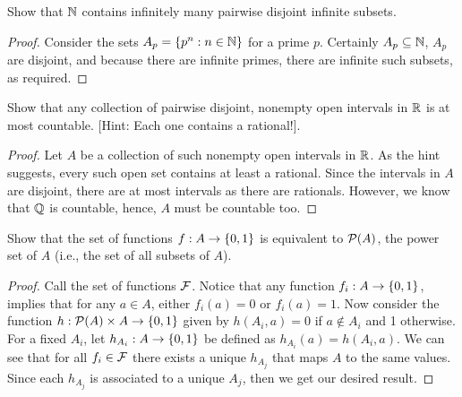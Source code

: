 \begin{exercise}{13}
Show that $\mathbb{N}$ contains infinitely many pairwise disjoint infinite subsets.
\end{exercise}
\begin{proof}
Consider the sets $A_p=\{p^n: n\in\mathbb{N}\}$ for a prime $p$. Certainly $A_p\subseteq \mathbb{N}$, $A_p$ are disjoint, and because there are infinite primes, there are infinite such subsets, as required.
\end{proof} 

\begin{exercise}{15}
Show that any collection of pairwise disjoint, nonempty open intervals in $\mathbb{R}$ is at most countable. [Hint: Each one contains a rational!].
\end{exercise}
\begin{proof}
Let $A$ be a collection of such nonempty open intervals in $\mathbb{R}$. As the hint suggests, every such open set contains at least a rational. Since the intervals in $A$ are disjoint, there are at most intervals as there are rationals. However, we know that $\mathbb{Q}$ is countable, hence, $A$ must be countable too.
\end{proof} 

\begin{exercise}{19}
Show that the set of functions $f:A\to\{0,1\}$ is equivalent to $\mathcal{P}(A)$, the power set of $A$ (i.e., the set of all subsets of $A$).
\end{exercise}
\begin{proof}
Call the set of functions $\mathcal{F}$. Notice that any function $f_i:A\to\{0,1\}$, implies that for any $a\in A$, either $f_i(a)=0$ or $f_i(a)=1$. Now consider the function $h:\mathcal{P}(A)\times A\to\{0,1\}$ given by $h(A_i,a)=0$ if $a\notin A_i$ and 1 otherwise. For a fixed $A_i$, let $h_{A_i}:A\to\{0,1\}$ be defined as $h_{A_i}(a)=h(A_i,a)$. We can see that for all $f_i\in\mathcal{F}$ there exists a unique $h_{A_j}$ that maps $A$ to the same values. Since each $h_{A_j}$ is associated to a unique $A_j$, then we get our desired result.
\end{proof} 
